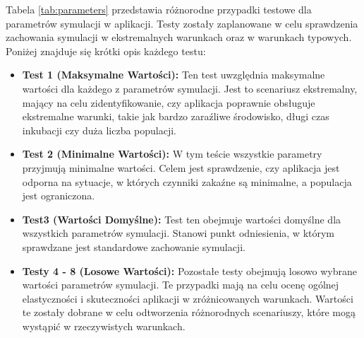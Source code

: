 Tabela \ref{tab:parameters} przedstawia różnorodne przypadki testowe dla parametrów symulacji w aplikacji. Testy zostały zaplanowane w celu sprawdzenia zachowania symulacji w ekstremalnych warunkach oraz w warunkach typowych. Poniżej znajduje się krótki opis każdego testu:

\begin{itemize}
	\item \textbf{Test 1 (Maksymalne Wartości):} Ten test uwzględnia maksymalne wartości dla każdego z parametrów symulacji. Jest to scenariusz ekstremalny, mający na celu zidentyfikowanie, czy aplikacja poprawnie obsługuje ekstremalne warunki, takie jak bardzo zaraźliwe środowisko, długi czas inkubacji czy duża liczba populacji.

	\item \textbf{Test 2 (Minimalne Wartości):} W tym teście wszystkie parametry przyjmują minimalne wartości. Celem jest sprawdzenie, czy aplikacja jest odporna na sytuacje, w których czynniki zakaźne są minimalne, a populacja jest ograniczona.
	
	\item \textbf{Test3 (Wartości Domyślne):} Test ten obejmuje wartości domyślne dla wszystkich parametrów symulacji. Stanowi punkt odniesienia, w którym sprawdzane jest standardowe zachowanie symulacji.
	
	\item \textbf{Testy 4 - 8 (Losowe Wartości):}
	 Pozostałe testy obejmują losowo wybrane wartości parametrów symulacji. Te przypadki mają na celu ocenę ogólnej elastyczności i skuteczności aplikacji w zróżnicowanych warunkach. Wartości te zostały dobrane w celu odtworzenia różnorodnych scenariuszy, które mogą wystąpić w rzeczywistych warunkach.
\end{itemize}
	
